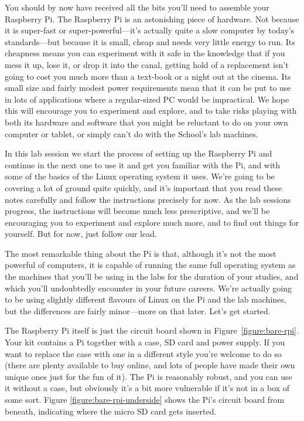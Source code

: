 You should by now have received all the bits you'll need to assemble your Raspberry Pi. The Raspberry Pi is an astonishing piece of hardware. Not because it is super-fast or super-powerful---it's actually quite a slow computer by today's standards---but because it is small, cheap and needs very little energy to run. Its cheapness means you can experiment with it safe in the knowledge that if you mess it up, lose it, or drop it into the canal, getting hold of a replacement isn't going to cost you much more than a text-book or a night out at the cinema. Its small size and fairly modest power requirements mean that it can be put to use in lots of applications where a regular-sized PC would be impractical.  We hope this will encourage you to experiment and explore, and to take risks playing with both its hardware and software that you might be reluctant to do on your own computer or tablet, or simply can't do with the School's lab machines.

In this lab session we start the process of setting up the  Raspberry Pi and continue in the next one to use it and get you familiar with the Pi, and with some of the basics of the Linux operating system it uses. We're going to be covering a lot of ground quite quickly, and it's important that you read these notes carefully and follow the instructions precisely for now. As the lab sessions progress, the instructions will become much less prescriptive, and we'll be encouraging you to experiment and explore much more, and to find out things for yourself. But for now, just follow our lead.

The most remarkable thing about the Pi is that, although it's not the most powerful of computers, it is capable of running the same full  operating system as the machines that you'll be using in the labs for the duration of your studies, and which you'll undoubtedly encounter in your future careers. We're actually going to be using slightly different flavours of Linux on the Pi and the lab machines, but the differences are fairly minor---more on that later. Let's get started.

The Raspberry Pi itself is just the circuit board shown in Figure~\ref{figure:bare-rpi}. Your kit contains a Pi together with a case, SD card and power supply. If you want to replace the case with one in a different style you're welcome to do so (there are plenty available to buy online, and lots of people have made their own unique ones just for the fun of it). The Pi is reasonably robust, and you can use it without a case, but obviously it's a bit more vulnerable if it's not in a box of some sort. Figure \ref{figure:bare-rpi-underside} shows the Pi's circuit board from beneath, indicating where the micro SD card gets inserted.


